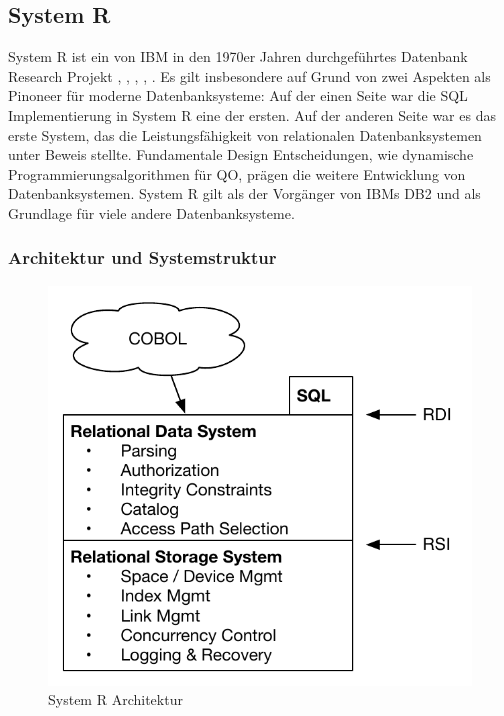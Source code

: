 \subsection{System R}

System R ist ein von IBM in den 1970er Jahren durchgeführtes Datenbank Research Projekt \cite{selinger1979access}, \cite{wade2012ibm}, \cite{chamberlin1981history}, \cite{astrahan1976system}, \cite{astrahan1978system}. Es gilt insbesondere auf Grund von zwei Aspekten als Pinoneer für moderne Datenbanksysteme: Auf der einen Seite war die \ac{SQL} Implementierung in System R eine der ersten. Auf der anderen Seite war es das erste System, das die Leistungsfähigkeit von relationalen Datenbanksystemen unter Beweis stellte. Fundamentale Design Entscheidungen, wie dynamische Programmierungsalgorithmen für \ac{QO}, prägen die weitere Entwicklung von Datenbanksystemen. System R gilt als der Vorgänger von IBMs DB2 und als Grundlage für viele andere Datenbanksysteme.


\subsubsection{Architektur und Systemstruktur}

\begin{figure}[ht]
  \centering
  \includegraphics{02_Related_Work/SystemR.pdf}
  \caption{System R Architektur \cite{astrahan1976system} \cite{astrahan1978system}}
  \label{SystemRArchitecture}
\end{figure}


